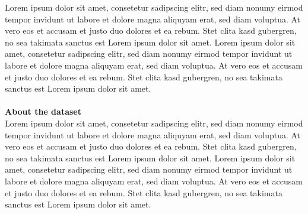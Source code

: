 Lorem ipsum dolor sit amet, consetetur sadipscing elitr, sed diam nonumy eirmod tempor invidunt ut labore et dolore magna aliquyam erat, sed diam voluptua. At vero eos et accusam et justo duo dolores et ea rebum. Stet clita kasd gubergren, no sea takimata sanctus est Lorem ipsum dolor sit amet. Lorem ipsum dolor sit amet, consetetur sadipscing elitr, sed diam nonumy eirmod tempor invidunt ut labore et dolore magna aliquyam erat, sed diam voluptua. At vero eos et accusam et justo duo dolores et ea rebum. Stet clita kasd gubergren, no sea takimata sanctus est Lorem ipsum dolor sit amet.
\\\\
\textbf{About the dataset}
\vspace{0.25cm}\\
Lorem ipsum dolor sit amet, consetetur sadipscing elitr, sed diam nonumy eirmod tempor invidunt ut labore et dolore magna aliquyam erat, sed diam voluptua. At vero eos et accusam et justo duo dolores et ea rebum. Stet clita kasd gubergren, no sea takimata sanctus est Lorem ipsum dolor sit amet. Lorem ipsum dolor sit amet, consetetur sadipscing elitr, sed diam nonumy eirmod tempor invidunt ut labore et dolore magna aliquyam erat, sed diam voluptua. At vero eos et accusam et justo duo dolores et ea rebum. Stet clita kasd gubergren, no sea takimata sanctus est Lorem ipsum dolor sit amet.
